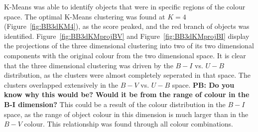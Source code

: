 K-Means was able to identify objects that were in specific regions of the colour space.
The optimal K-Means clustering was found at $K=4$ (Figure~\ref{fig:BB3dKM4}), as the score peaked, and the red branch of objects was identified.
Figure~\ref{fig:BB3dKMprojBV} and Figure~\ref{fig:BB3dKMprojBI} display the projections of the three dimensional clustering into two of its two dimensional components with the original colour from the two dimensional space.
It is clear that the three dimensional clustering was driven by the $B - I$ vs. $U - B$ distribution, as the clusters were almost completely seperated in that space.
The clusters overlapped extensively in the $B - V$ vs. $U - B$ space. \textbf{PB: Do you know why this would be? Would it be from the range of colour in the B-I dimension?}
This could be a result of the colour distribution in the $B - I$ space, as the range of object colour in this dimension is much larger than in the $B - V$ colour.
This relationship was found through all colour combinations.

